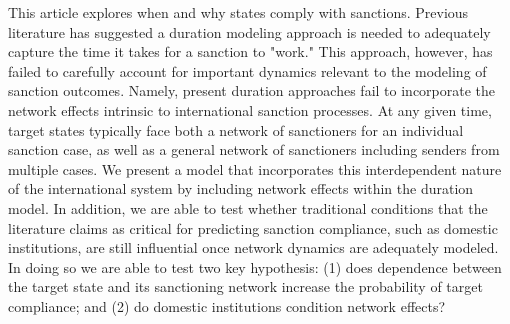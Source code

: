 This article explores when and why states comply with sanctions. Previous literature has suggested a duration modeling approach is needed to adequately capture the time it takes for a sanction to "work." This approach, however, has failed to carefully account for important dynamics relevant to the modeling of sanction outcomes. Namely, present duration approaches fail to incorporate the network effects intrinsic to international sanction processes. At any given time, target states typically face both a network of sanctioners for an individual sanction case, as well as a general network of sanctioners including senders from multiple cases. We present a model that incorporates this interdependent nature of the international system by including network effects within the duration model. In addition, we are able to test whether traditional conditions that the literature claims as critical for predicting sanction compliance, such as domestic institutions, are still influential once network dynamics are adequately modeled. In doing so we are able to test two key hypothesis: (1) does dependence between the target state and its sanctioning network increase the probability of target compliance; and (2) do domestic institutions condition network effects?